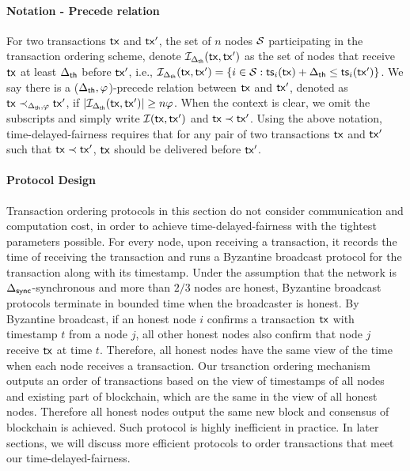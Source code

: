 \paragraph{Notation - Precede relation} For two transactions $\mathsf{tx}$ and $\mathsf{tx}'$, the set of $n$ nodes $\mathcal{S}$ participating in the transaction ordering scheme, denote $\mathcal{I}_{\Delta_{\mathsf{th}}}(\mathsf{tx}, \mathsf{tx}')$ as the set of nodes that receive $\mathsf{tx}$ at least $\Delta_{\mathsf{th}}$ before $\mathsf{tx}'$, i.e., $\mathcal{I}_{\Delta_{\mathsf{th}}}(\mathsf{tx}, \mathsf{tx}') = \{i\in \mathcal{S}: \mathsf{ts}_i(\mathsf{tx}) + \Delta_{\mathsf{th}}\le \mathsf{ts}_i(\mathsf{tx}')\}$. We say there is a ($\Delta_{\mathsf{th}}, \varphi$)-precede relation between $\mathsf{tx}$ and $\mathsf{tx}'$, denoted as $\mathsf{tx} \prec_{\Delta_{\mathsf{th}}, \varphi} \mathsf{tx}'$, if $|\mathcal{I}_{\Delta_{\mathsf{th}}}(\mathsf{tx}, \mathsf{tx}')| \ge n\varphi$. When the context is clear, we omit the subscripts and simply write $\mathcal{I}(\mathsf{tx}, \mathsf{tx}')$ and $\mathsf{tx} \prec \mathsf{tx}'$. Using the above notation, time-delayed-fairness requires that for any pair of two transactions $\mathsf{tx}$ and $\mathsf{tx}'$ such that $\mathsf{tx}\prec \mathsf{tx}'$,  $\mathsf{tx}$ should be delivered before $\mathsf{tx}'$. 

\paragraph{Protocol Design} Transaction ordering protocols in this section do not consider communication and computation cost, in order to achieve time-delayed-fairness with the tightest parameters possible. For every node, upon receiving a transaction, it records the time of receiving the transaction and runs a Byzantine broadcast protocol for the transaction along with its timestamp. Under the assumption that the network is $\Delta_{\mathsf{sync}}$-synchronous and more than $2/3$ nodes are honest, Byzantine broadcast protocols terminate in bounded time when the broadcaster is honest.  By Byzantine broadcast, if an honest node $i$ confirms a transaction $\mathsf{tx}$ with timestamp $t$ from a node $j$, all other honest nodes also confirm that node $j$ receive $\mathsf{tx}$ at time $t$. Therefore, all honest nodes have the same view of the time when each node receives a transaction. Our trsanction ordering mechanism outputs an order of transactions based on the view of timestamps of all nodes and existing part of blockchain, which are the same in the view of all honest nodes. Therefore all honest nodes output the same new block and consensus of blockchain is achieved. Such protocol is highly inefficient in practice. In later sections, we will discuss more efficient protocols to order transactions that meet our time-delayed-fairness. 

